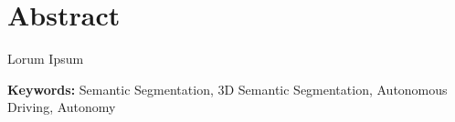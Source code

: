 \section*{Abstract}
Lorum Ipsum

\vspace{.5cm}

\textbf{Keywords:} Semantic Segmentation, 3D Semantic Segmentation, Autonomous Driving, Autonomy
\newpage
